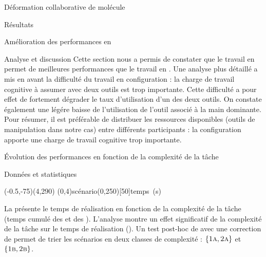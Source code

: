 \documentclass[myfrancais]{mythesis}
\begin{document}
\begin{mychapter}{Déformation collaborative de molécule}
\begin{mysection}{Résultats}
\begin{mysubsection}{Amélioration des performances en }
\begin{mysubsubsection}{Analyse et discussion}
					Cette section nous a permis de constater que le travail en  permet de meilleures performances que le travail en .
					Une analyse plus détaillé a mis en avant la difficulté du travail en configuration  : la charge de travail cognitive à assumer avec deux outils est trop importante.
					Cette difficulté a pour effet de fortement dégrader le taux d'utilisation d'un des deux outils.
					On constate également une légére baisse de l'utilisation de l'outil associé à la main dominante.
					Pour résumer, il est préférable de distribuer les ressources disponibles (outils de manipulation dans notre cas) entre différents participants : la configuration  apporte une charge de travail cognitive trop importante.
				\end{mysubsubsection}
			\end{mysubsection}
			\begin{mysubsection}{Évolution des performances en fonction de la complexité de la tâche}
				\begin{mysubsubsection}{Données et statistiques}
					\begin{myfigure}
						\begin{myps}(-0.5,-75)(4,290)
							\myaxes(0,4){scénario}(0,250)[50]{temps~(s)}
						\end{myps}
					\end{myfigure}

					La  présente le temps de réalisation  en fonction de la complexité de la tâche  (temps cumulé des  et des ).
					L'analyse montre un effet significatif de la complexité de la tâche  sur le temps de réalisation  ().
					Un test post-hoc de  avec une correction de  permet de trier les scénarios en deux classes de complexité : $\left\{\textsc{1a}, \textsc{2a}\right\}$ et $\left\{\textsc{1b}, \textsc{2b}\right\}$.


\end{mysubsubsection}
\end{mysubsection}
\end{mysection}
\end{mychapter}
\end{document}
